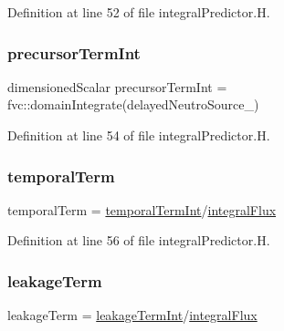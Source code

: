 Definition at line 52 of file integral\+Predictor.\+H.

\mbox{\label{integralPredictor_8H_a6f122f03262179afd60cc84232ee4bf9}} 
\subsubsection{\texorpdfstring{precursor\+Term\+Int}{precursorTermInt}}
{\footnotesize\ttfamily dimensioned\+Scalar precursor\+Term\+Int = fvc\+::domain\+Integrate(delayed\+Neutro\+Source\+\_\+)}



Definition at line 54 of file integral\+Predictor.\+H.

\mbox{\label{integralPredictor_8H_aaef87b89b227970fd6792c5bff5dcf92}} 
\subsubsection{\texorpdfstring{temporal\+Term}{temporalTerm}}
{\footnotesize\ttfamily temporal\+Term = \hyperlink{integralPredictorSP3_8H_a6a6bc2b4b802b67f7144e4fd168ce1b5}{temporal\+Term\+Int}/\hyperlink{integralPredictorSP3_8H_a2a0b08b13037e807e2dd9a5db5f493fa}{integral\+Flux}}



Definition at line 56 of file integral\+Predictor.\+H.

\mbox{\label{integralPredictor_8H_a3870febfb4d6b903e191a3f6937b92e7}} 
\subsubsection{\texorpdfstring{leakage\+Term}{leakageTerm}}
{\footnotesize\ttfamily leakage\+Term = \hyperlink{integralPredictorSP3_8H_a1edc21b2e8fa9d1796ee10236abc2889}{leakage\+Term\+Int}/\hyperlink{integralPredictorSP3_8H_a2a0b08b13037e807e2dd9a5db5f493fa}{integral\+Flux}}



